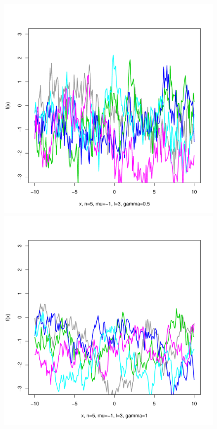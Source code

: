 \documentclass[12pt,letterpaper]{article}
\begin{document}
\begin{figure}
\begin{center}
\includegraphics[scale=0.2]{hw321/n5-m-1-l3-g1.pdf}
\includegraphics[scale=0.2]{hw321/n5-m-1-l3-g2.pdf}

\end{center}
\end{figure}
\end{document}
